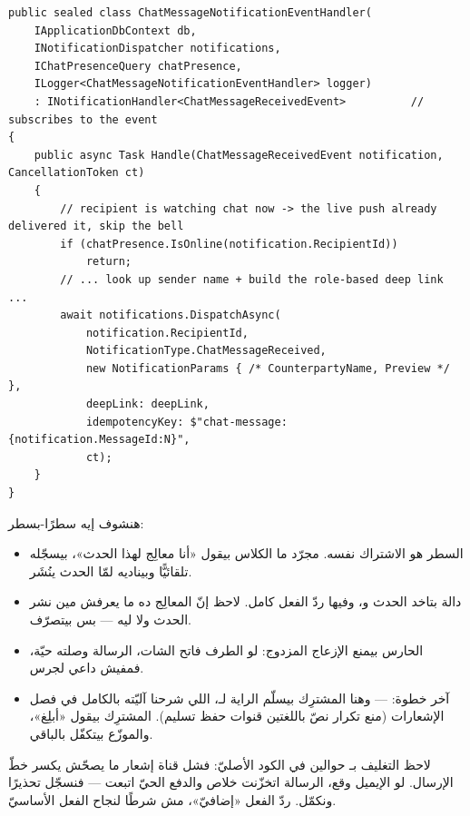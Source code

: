\begin{english}
\begin{lstlisting}[language={[Sharp]C}]
public sealed class ChatMessageNotificationEventHandler(
    IApplicationDbContext db,
    INotificationDispatcher notifications,
    IChatPresenceQuery chatPresence,
    ILogger<ChatMessageNotificationEventHandler> logger)
    : INotificationHandler<ChatMessageReceivedEvent>          // subscribes to the event
{
    public async Task Handle(ChatMessageReceivedEvent notification, CancellationToken ct)
    {
        // recipient is watching chat now -> the live push already delivered it, skip the bell
        if (chatPresence.IsOnline(notification.RecipientId))
            return;
        // ... look up sender name + build the role-based deep link ...
        await notifications.DispatchAsync(
            notification.RecipientId,
            NotificationType.ChatMessageReceived,
            new NotificationParams { /* CounterpartyName, Preview */ },
            deepLink: deepLink,
            idempotencyKey: $"chat-message:{notification.MessageId:N}",
            ct);
    }
}
\end{lstlisting}
\end{english}

هنشوف إيه سطرًا-بسطر:
\begin{itemize}
\item السطر  هو
  الاشتراك نفسه. مجرّد ما الكلاس بيقول «أنا معالِج لهذا الحدث»، 
  بيسجّله تلقائيًّا وبيناديه لمّا الحدث ينُشَر.
\item دالة  بتاخد الحدث و، وفيها ردّ الفعل
  كامل. لاحظ إنّ المعالِج ده ما يعرفش مين نشر الحدث ولا ليه — بس بيتصرّف.
\item الحارس  بيمنع الإزعاج
  المزدوج: لو الطرف فاتح الشات، الرسالة وصلته حيّة، فمفيش داعي لجرس.
\item آخر خطوة:  — وهنا المشترِك بيسلّم
  الراية لـ، اللي شرحنا آليّته بالكامل في فصل
  الإشعارات (منع تكرار \en{$\rightarrow$} نصّ باللغتين \en{$\rightarrow$} قنوات
  \en{$\rightarrow$} حفظ \en{$\rightarrow$} تسليم). المشترِك بيقول «أبلِغ»،
  والموزّع بيتكفّل بالباقي.
\end{itemize}

\begin{note}
لاحظ التغليف بـ حوالين  في الكود الأصليّ:
فشل قناة إشعار ما يصحّش يكسر خطّ الإرسال. لو الإيميل وقع، الرسالة اتخزّنت
خلاص والدفع الحيّ اتبعت — فنسجّل تحذيرًا ونكمّل. ردّ الفعل «إضافيّ»، مش شرطًا
لنجاح الفعل الأساسيّ.
\end{note}


